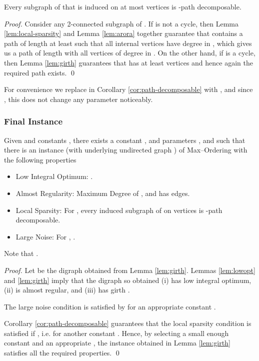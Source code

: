 \documentclass[oribibl]{llncs}
\newcommand{\maxk}{{\sc Max--Ordering}\xspace}
\begin{document}
\begin{corollary} \label{cor:path-decomposable} Every subgraph
 of  that is induced on at most 
vertices is -path decomposable.  
\end{corollary} 
\begin{proof}
	Consider any 2-connected subgraph  of . If 
	is not a cycle, then Lemma \ref{lem:local-sparsity} and Lemma
	\ref{lem:arora} together guarantee that  contains a path of
	length at least  such that all internal vertices have
	degree  in , which gives us a path of length 
	with all vertices of degree  in . 
	On the other hand, if  is a cycle, then Lemma
	\ref{lem:girth} guarantees that  has at least 
	vertices and hence again the required path exists.  \qed
\end{proof}
For convenience we replace  in Corollary
\ref{cor:path-decomposable} with , and since , this does not change any parameter noticeably.

\subsubsection{Final Instance}

\begin{theorem} 
	\label{thm:instance} Given 
	and constants , there exists a constant , and parameters ,
	and  such that there
	is an instance  (with underlying undirected 
	graph ) of \maxk with the following properties 
	\begin{itemize} 
		\item Low Integral Optimum: . 
		\item Almost Regularity: Maximum Degree of , and  has 
			 edges.  
		\item Local Sparsity: For , every
			induced subgraph of  on  
			vertices is -path decomposable.  
		\item Large Noise: For , 
			. 
	\end{itemize}
	Note that . 
\end{theorem}
\begin{proof}
	Let  be the digraph obtained from Lemma \ref{lem:girth}.  
	Lemmas \ref{lem:lowopt} and \ref{lem:girth} imply that  
the digraph  so obtained
(i) has low integral optimum, (ii) is almost regular, and (iii) has
girth . 

The large noise condition is satisfied by  for an appropriate constant . 

Corollary \ref{cor:path-decomposable} guarantees that the local
sparsity condition is satisfied if , i.e.
 for another constant . Hence,
by selecting a small enough constant  and an appropriate , 
the instance  obtained in Lemma \ref{lem:girth}
satisfies all the required properties. \qed 
\end{proof}
\end{document}
